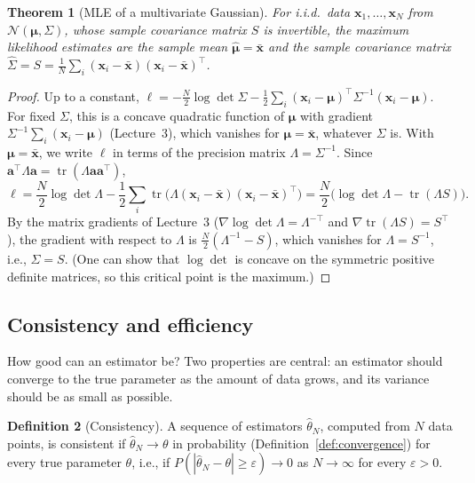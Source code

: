\documentclass[11pt]{article}
\theoremstyle{definition}
\newtheorem{definition}{Definition}[section]
\theoremstyle{plain}
\newtheorem{theorem}[definition]{Theorem}
\theoremstyle{remark}
\DeclareMathOperator{\tr}{tr}
\begin{document}
\begin{theorem}[MLE of a multivariate Gaussian]\label{thm:mle-mvn}
    For i.i.d.\ data $\mathbf{x}_1, \ldots, \mathbf{x}_N$ from $\mathcal{N}(\boldsymbol{\mu}, \Sigma)$, whose sample covariance matrix $S$ is invertible, the maximum likelihood estimates are the sample mean $\hat{\boldsymbol{\mu}} = \bar{\mathbf{x}}$ and the sample covariance matrix $\hat\Sigma = S = \frac{1}{N}\sum_i (\mathbf{x}_i - \bar{\mathbf{x}})(\mathbf{x}_i - \bar{\mathbf{x}})^\top$.
\end{theorem}

\begin{proof}
    Up to a constant, $\ell = -\frac{N}{2}\log\det\Sigma - \frac{1}{2}\sum_i (\mathbf{x}_i - \boldsymbol{\mu})^\top\Sigma^{-1}(\mathbf{x}_i - \boldsymbol{\mu})$. For fixed $\Sigma$, this is a concave quadratic function of $\boldsymbol{\mu}$ with gradient $\Sigma^{-1}\sum_i (\mathbf{x}_i - \boldsymbol{\mu})$ (Lecture~3), which vanishes for $\boldsymbol{\mu} = \bar{\mathbf{x}}$, whatever $\Sigma$ is. With $\boldsymbol{\mu} = \bar{\mathbf{x}}$, we write $\ell$ in terms of the precision matrix $\Lambda = \Sigma^{-1}$. Since $\mathbf{a}^\top\Lambda\mathbf{a} = \tr(\Lambda\mathbf{a}\mathbf{a}^\top)$,
    \[\ell = \frac{N}{2}\log\det\Lambda - \frac{1}{2}\sum_i \tr\big(\Lambda(\mathbf{x}_i - \bar{\mathbf{x}})(\mathbf{x}_i - \bar{\mathbf{x}})^\top\big) = \frac{N}{2}\big(\log\det\Lambda - \tr(\Lambda S)\big).\]
    By the matrix gradients of Lecture~3 ($\nabla\log\det\Lambda = \Lambda^{-\top}$ and $\nabla\tr(\Lambda S) = S^\top$), the gradient with respect to $\Lambda$ is $\frac{N}{2}(\Lambda^{-1} - S)$, which vanishes for $\Lambda = S^{-1}$, i.e., $\Sigma = S$. (One can show that $\log\det$ is concave on the symmetric positive definite matrices, so this critical point is the maximum.)
\end{proof}

\subsection{Consistency and efficiency}

How good can an estimator be? Two properties are central: an estimator should converge to the true parameter as the amount of data grows, and its variance should be as small as possible.

\begin{definition}[Consistency]\label{def:consistent}
    A sequence of estimators $\hat\theta_N$, computed from $N$ data points, is consistent if $\hat\theta_N \to \theta$ in probability (Definition~\ref{def:convergence}) for every true parameter $\theta$, i.e., if $P(|\hat\theta_N - \theta| \geq \varepsilon) \to 0$ as $N \to \infty$ for every $\varepsilon > 0$.
\end{definition}
\end{document}
